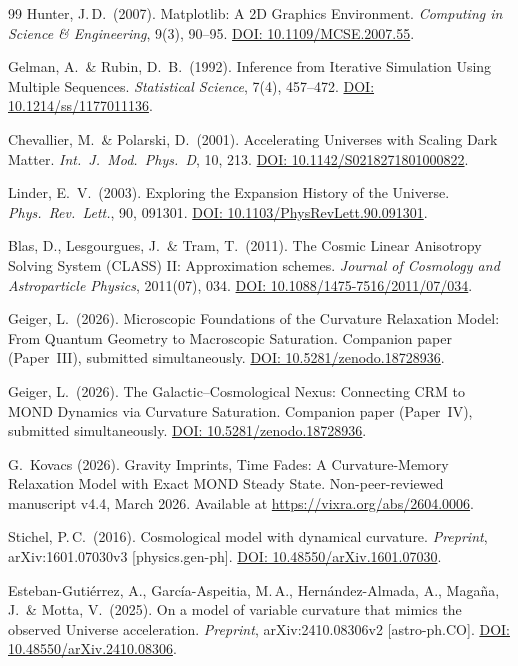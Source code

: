 \documentclass[aps,prd,twocolumn,superscriptaddress,nofootinbib]{revtex4-2}
\begin{document}
\begin{thebibliography}{99}
Hunter, J.\,D.\ (2007).
Matplotlib: A 2D Graphics Environment.
\textit{Computing in Science \& Engineering}, 9(3), 90--95.
\href{https://doi.org/10.1109/MCSE.2007.55}{DOI: 10.1109/MCSE.2007.55}.

Gelman, A.\ \& Rubin, D.~B.\ (1992).
Inference from Iterative Simulation Using Multiple Sequences.
\textit{Statistical Science}, 7(4), 457--472.
\href{https://doi.org/10.1214/ss/1177011136}{DOI: 10.1214/ss/1177011136}.

Chevallier, M.\ \& Polarski, D.\ (2001).
Accelerating Universes with Scaling Dark Matter.
\textit{Int.\ J.\ Mod.\ Phys.\ D}, 10, 213.
\href{https://doi.org/10.1142/S0218271801000822}{DOI: 10.1142/S0218271801000822}.

Linder, E.~V.\ (2003).
Exploring the Expansion History of the Universe.
\textit{Phys.\ Rev.\ Lett.}, 90, 091301.
\href{https://doi.org/10.1103/PhysRevLett.90.091301}{DOI: 10.1103/PhysRevLett.90.091301}.

Blas, D., Lesgourgues, J.\ \& Tram, T.\ (2011).
The Cosmic Linear Anisotropy Solving System (CLASS) II: Approximation schemes.
\textit{Journal of Cosmology and Astroparticle Physics}, 2011(07), 034.
\href{https://doi.org/10.1088/1475-7516/2011/07/034}{DOI: 10.1088/1475-7516/2011/07/034}.

Geiger, L.\ (2026).
Microscopic Foundations of the Curvature Relaxation Model: From Quantum Geometry to Macroscopic Saturation.
Companion paper (Paper~III), submitted simultaneously.
\href{https://doi.org/10.5281/zenodo.18728936}{DOI: 10.5281/zenodo.18728936}.

Geiger, L.\ (2026).
The Galactic--Cosmological Nexus: Connecting CRM to MOND Dynamics via Curvature Saturation.
Companion paper (Paper~IV), submitted simultaneously.
\href{https://doi.org/10.5281/zenodo.18728936}{DOI: 10.5281/zenodo.18728936}.

G.~Kovacs (2026).
Gravity Imprints, Time Fades: A Curvature-Memory Relaxation Model with Exact MOND Steady State.
Non-peer-reviewed manuscript v4.4, March 2026.
Available at \url{https://vixra.org/abs/2604.0006}.

Stichel, P.\,C.\ (2016).
Cosmological model with dynamical curvature.
\textit{Preprint}, arXiv:1601.07030v3 [physics.gen-ph].
\href{https://doi.org/10.48550/arXiv.1601.07030}{DOI: 10.48550/arXiv.1601.07030}.

Esteban-Guti\'errez, A., Garc\'ia-Aspeitia, M.\,A., Hern\'andez-Almada, A., Maga\~na, J.\ \& Motta, V.\ (2025).
On a model of variable curvature that mimics the observed Universe acceleration.
\textit{Preprint}, arXiv:2410.08306v2 [astro-ph.CO].
\href{https://doi.org/10.48550/arXiv.2410.08306}{DOI: 10.48550/arXiv.2410.08306}.

\end{thebibliography}
\end{document}
